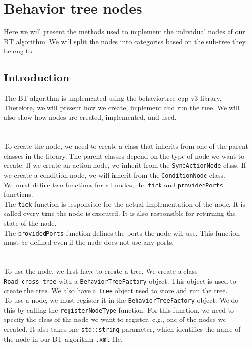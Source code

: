 \section{Behavior tree nodes}
    Here we will present the methods used to implement the individual nodes of our BT algorithm. We will split the nodes into categories based on the sub-tree they belong to.
    \subsection{Introduction}
        The BT algorithm is implemented using the behaviortree-cpp-v3 library. Therefore, we will present how we create, implement and run the tree. We will also show how nodes are created, implemented, and used.\\\\
        \\
            To create the node, we need to create a class that inherits from one of the parent classes in the library. The parent classes depend on the type of node we want to create. If we create an action node, we inherit from the \texttt{SyncActionNode} class. If we create a condition node, we will inherit from the \texttt{ConditionNode} class.\\
            We must define two functions for all nodes, the \texttt{tick} and \texttt{providedPorts} functions.\\
            The \texttt{tick} function is responsible for the actual implementation of the node. It is called every time the node is executed. It is also responsible for returning the state of the node.\\
            The \texttt{providedPorts} function defines the ports the node will use. This function must be defined even if the node does not use any ports.\\\\
        \\
            To use the node, we first have to create a tree. We create a class \texttt{Road\_cross\_tree} with a \texttt{BehaviorTreeFactory} object. This object is used to create the tree. We also have a \texttt{Tree} object used to store and run the tree.\\
            To use a node, we must register it in the \texttt{BehaviorTreeFactory} object. We do this by calling the \texttt{registerNodeType} function. For this function, we need to specify the class of the node we want to register, e.g., one of the nodes we created. It also takes one \texttt{std::string} parameter, which identifies the name of the node in our BT algorithm \texttt{.xml} file.\\\\
